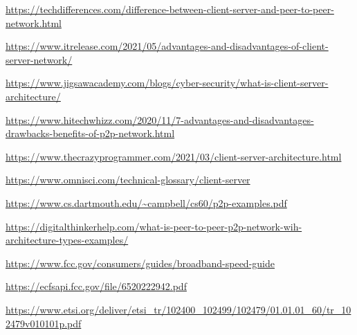 \documentclass[a4paper, 11pt]{article}
\begin{document}
\begin{thebibliography}{}

\url{https://techdifferences.com/difference-between-client-server-and-peer-to-peer-network.html}

\url{https://www.itrelease.com/2021/05/advantages-and-disadvantages-of-client-server-network/}

\url{https://www.jigsawacademy.com/blogs/cyber-security/what-is-client-server-architecture/}

\url{https://www.hitechwhizz.com/2020/11/7-advantages-and-disadvantages-drawbacks-benefits-of-p2p-network.html}

\url{https://www.thecrazyprogrammer.com/2021/03/client-server-architecture.html}

\url{https://www.omnisci.com/technical-glossary/client-server}

\url{https://www.cs.dartmouth.edu/~campbell/cs60/p2p-examples.pdf}

\url{https://digitalthinkerhelp.com/what-is-peer-to-peer-p2p-network-wih-architecture-types-examples/}

\url{https://www.fcc.gov/consumers/guides/broadband-speed-guide}

\url{https://ecfsapi.fcc.gov/file/6520222942.pdf}

\url{https://www.etsi.org/deliver/etsi_tr/102400_102499/102479/01.01.01_60/tr_102479v010101p.pdf}

\end{thebibliography}
\end{document}
